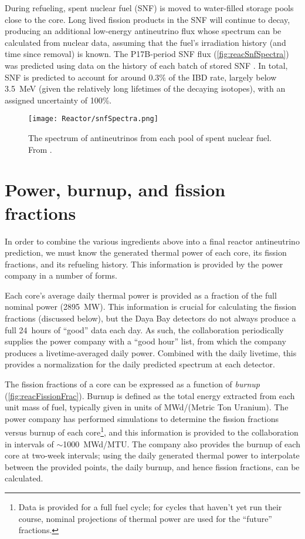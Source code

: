 \documentclass[../thesis.tex]{subfiles}
\begin{document}
During refueling, spent nuclear fuel (SNF) is moved to water-filled storage pools close to the core. Long lived fission products in the SNF will continue to decay, producing an additional low-energy antineutrino flux whose spectrum can be calculated from nuclear data, assuming that the fuel's irradiation history (and time since removal) is known. The P17B-period SNF flux (\autoref{fig:reacSnfSpectra}) was predicted using data on the history of each batch of stored SNF \cite{p17bSnf}. In total, SNF is predicted to account for around 0.3\% of the IBD rate, largely below 3.5~MeV (given the relatively long lifetimes of the decaying isotopes), with an assigned uncertainty of 100\%.

\begin{figure}[ht]
  \texttt{[image: Reactor/snfSpectra.png]}
  \caption{The spectrum of antineutrinos from each pool of spent nuclear fuel. From \cite{p17bSnf}.}
    \label{fig:reacSnfSpectra}
\end{figure}

\section{Power, burnup, and fission fractions}
\label{sec:reacpow}

In order to combine the various ingredients above into a final reactor antineutrino prediction, we must know the generated thermal power of each core, its fission fractions, and its refueling history. This information is provided by the power company in a number of forms.

Each core's average daily thermal power is provided as a fraction of the full nominal power (2895~MW). This information is crucial for calculating the fission fractions (discussed below), but the Daya Bay detectors do not always produce a full 24~hours of ``good'' data each day. As such, the collaboration periodically supplies the power company with a ``good hour'' list, from which the company produces a livetime-averaged daily power. Combined with the daily livetime, this provides a normalization for the daily predicted spectrum at each detector.

The fission fractions of a core can be expressed as a function of \emph{burnup} (\autoref{fig:reacFissionFrac}). Burnup is defined as the total energy extracted from each unit mass of fuel, typically given in units of MWd/(Metric Ton Uranium). The power company has performed simulations to determine the fission fractions versus burnup of each core\footnote{Data is provided for a full fuel cycle; for cycles that haven't yet run their course, nominal projections of thermal power are used for the ``future'' fractions.}, and this information is provided to the collaboration in intervals of $\sim$1000~MWd/MTU. The company also provides the burnup of each core at two-week intervals; using the daily generated thermal power to interpolate between the provided points, the daily burnup, and hence fission fractions, can be calculated.
\end{document}

